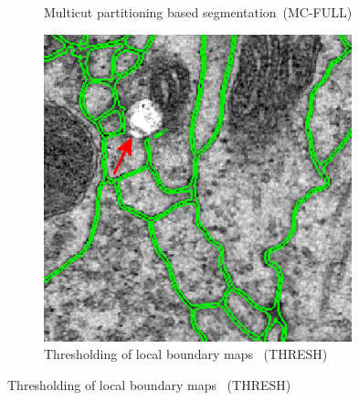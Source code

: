 \begin{figure}[htp]
\begin{subfigure}[t]{0.41 \linewidth}
        \caption{Multicut partitioning based segmentation~(MC-FULL)} \label{fig:mc_full}
    \end{subfigure}\hspace{0.5cm}
    \begin{subfigure}[t]{0.41 \linewidth}
        \centering
        \includegraphics[width=0.98\textwidth]{figures/MWS/images/thresholded_1.png}
        \caption{Thresholding of local boundary maps ~(THRESH)} \label{fig:thresh}
    \end{subfigure}%
    

\end{figure}
